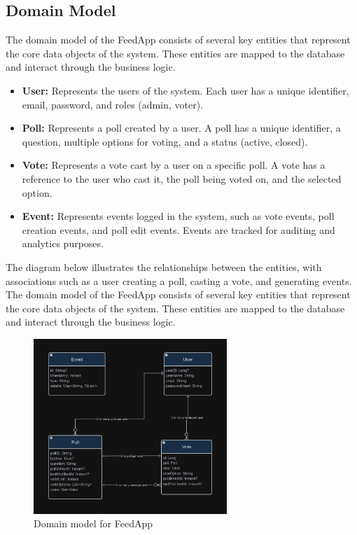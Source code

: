 \subsection{Domain Model}
The domain model of the FeedApp consists of several key entities that represent the core data objects of the system. These entities are mapped to the database and interact through the business logic.
\begin{itemize}
    \item \textbf{User:} Represents the users of the system. Each user has a unique identifier, email, password, and roles (admin, voter).
    \item \textbf{Poll:} Represents a poll created by a user. A poll has a unique identifier, a question, multiple options for voting, and a status (active, closed).
    \item \textbf{Vote:} Represents a vote cast by a user on a specific poll. A vote has a reference to the user who cast it, the poll being voted on, and the selected option.
    \item \textbf{Event:} Represents events logged in the system, such as vote events, poll creation events, and poll edit events. Events are tracked for auditing and analytics purposes.
\end{itemize}

The diagram below illustrates the relationships between the entities, with associations such as a user creating a poll, casting a vote, and generating events. The domain model of the FeedApp consists of several key entities that represent the core data objects of the system. These entities are mapped to the database and interact through the business logic.

\begin{figure}[H]
    \centering
    \includegraphics[width=0.65\textwidth]{./figs/domain-model.png}
    \caption{Domain model for FeedApp}
    \label{fig:domain_model}
\end{figure}


